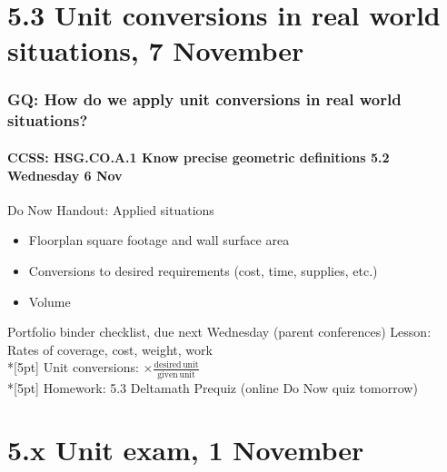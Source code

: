 \documentclass{beamer}
\begin{document}
\section{5.3 Unit conversions in real world situations, 7 November}
\frame
{
  \frametitle{GQ: How do we apply unit conversions in real world situations?}
  \framesubtitle{CCSS: HSG.CO.A.1 Know precise geometric definitions \hfill \alert{5.2 Wednesday 6 Nov}}

  \begin{block}{Do Now Handout: Applied situations}
  \begin{itemize}
    \item Floorplan square footage and wall surface area
    \item Conversions to desired requirements (cost, time, supplies, etc.)
    \item Volume
  \end{itemize}
  \end{block}
  Portfolio binder checklist, due next Wednesday (parent conferences)
  Lesson: Rates of coverage, cost, weight, work \\*[5pt]
  Unit conversions: $\displaystyle \times \frac{\mathrm{desired}\, \mathrm{unit}}{\mathrm{given}\, \mathrm{unit}}$ \\*[5pt]
  Homework: 5.3 Deltamath Prequiz (online Do Now quiz tomorrow)
}


\section{5.x Unit exam, 1 November}
\end{document}
